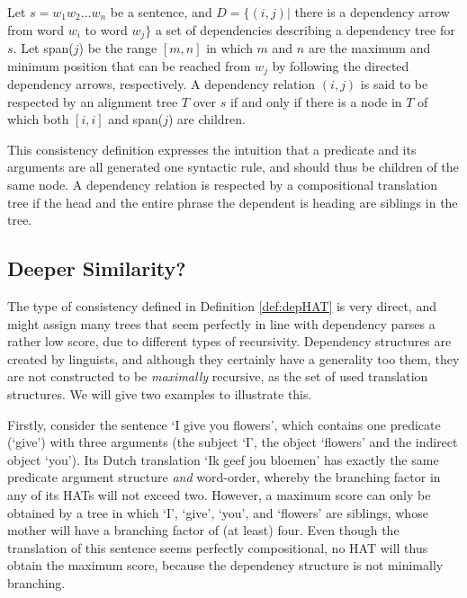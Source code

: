 \documentclass{report}
\begin{document}
\begin{metric}\label{met:depHAT}
Let $s = w_1 w_2 \dots w_n$ be a sentence, and $D = \{ (i,j) |$ there is a dependency arrow from word $w_i$ to word $w_j \}$ a set of dependencies describing a dependency tree for $s$. Let span($j$) be the range $[m,n]$ in which $m$ and $n$ are the maximum and minimum position that can be reached from $w_j$ by following the directed dependency arrows, respectively. A dependency relation $(i,j)$ is said to be respected by an alignment tree $T$ over $s$ if and only if there is a node in $T$ of which both $[i,i]$ and span($j$) are children.
\end{metric}

\noindent This consistency definition expresses the intuition that a predicate and its arguments are all generated one syntactic rule, and should thus be children of the same node. A dependency relation is respected by a compositional translation tree if the head and the entire phrase the dependent is heading are siblings in the tree.

\subsection{Deeper Similarity?}

The type of consistency defined in Definition \ref{def:depHAT} is very direct, and might assign many trees that seem perfectly in line with dependency parses a rather low score, due to different types of recursivity. Dependency structures are created by linguists, and although they certainly have a generality too them, they are not constructed to be \textit{maximally} recursive, as the set of used translation structures. We will give two examples to illustrate this.

Firstly, consider the sentence `I give you flowers', which contains one predicate (`give') with three arguments (the subject `I', the object `flowers' and the indirect object `you'). Its Dutch translation `Ik geef jou bloemen' has exactly the same predicate argument structure \textit{and} word-order, whereby the branching factor in any of its HATs will not exceed two. However, a maximum score can only be obtained by a tree in which `I', `give', `you', and `flowers' are siblings, whose mother will have a branching factor of (at least) four. Even though the translation of this sentence seems perfectly compositional, no HAT will thus obtain the maximum score, because the dependency structure is not minimally branching.
\end{document}
